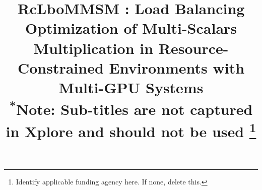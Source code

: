 \documentclass[conference]{IEEEtran}
\begin{document}
\title{RcLboMMSM : Load Balancing Optimization of Multi-Scalars Multiplication in Resource-Constrained Environments with Multi-GPU Systems\\
{\footnotesize \textsuperscript{*}Note: Sub-titles are not captured in Xplore and
should not be used}
\thanks{Identify applicable funding agency here. If none, delete this.}
}

\author{
\and
{}
\and
{}
}

\maketitle
\end{document}
